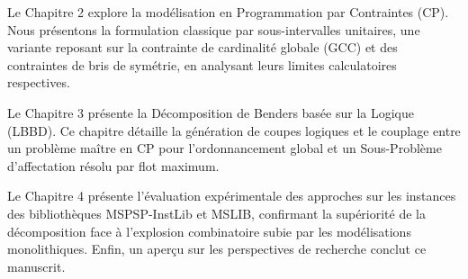 \bigskip
\noindent Le Chapitre 2 explore la modélisation en Programmation par Contraintes (CP). Nous présentons la formulation classique par sous-intervalles unitaires, une variante reposant sur la contrainte de cardinalité globale (GCC) et des contraintes de bris de symétrie, en analysant leurs limites calculatoires respectives.

\bigskip
\noindent Le Chapitre 3 présente la Décomposition de Benders basée sur la Logique (LBBD). Ce chapitre détaille la génération de coupes logiques et le couplage entre un problème maître en CP pour l'ordonnancement global et un Sous-Problème d'affectation résolu par flot maximum.

\bigskip
\noindent Le Chapitre 4 présente l'évaluation expérimentale des approches sur les instances des bibliothèques MSPSP-InstLib et  MSLIB, confirmant la supériorité de la décomposition face à l'explosion combinatoire subie par les modélisations monolithiques. Enfin, un aperçu sur les perspectives de recherche conclut ce manuscrit.
\bigskip
